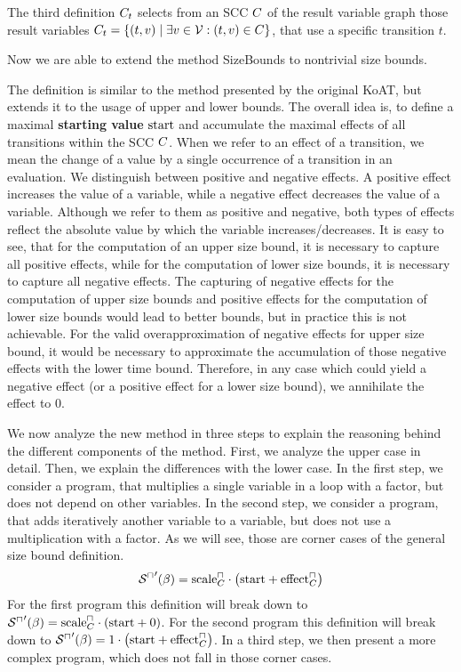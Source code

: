 The third definition $C_t$ selects from an SCC $C$ of the result variable graph those result variables $C_t = \lbrace (t,v) \mid \exists v \in \mathcal{V} : (t,v) \in C \rbrace$, that use a specific transition $t$.


Now we are able to extend the method SizeBounds to nontrivial size bounds.



The definition is similar to the method presented by the original KoAT, but extends it to the usage of upper and lower bounds.
The overall idea is, to define a maximal \textbf{starting value} $\text{start}$ and accumulate the maximal effects of all transitions within the SCC $C$.
When we refer to an effect of a transition, we mean the change of a value by a single occurrence of a transition in an evaluation.
We distinguish between positive and negative effects.
A positive effect increases the value of a variable, while a negative effect decreases the value of a variable.
Although we refer to them as positive and negative, both types of effects reflect the absolute value by which the variable increases/decreases.
It is easy to see, that for the computation of an upper size bound, it is necessary to capture all positive effects, while for the computation of lower size bounds, it is necessary to capture all negative effects.
The capturing of negative effects for the computation of upper size bounds and positive effects for the computation of lower size bounds would lead to better bounds, but in practice this is not achievable.
For the valid overapproximation of negative effects for upper size bound, it would be necessary to approximate the accumulation of those negative effects with the lower time bound.
Therefore, in any case which could yield a negative effect (or a positive effect for a lower size bound), we annihilate the effect to $0$.

We now analyze the new method in three steps to explain the reasoning behind the different components of the method.
First, we analyze the upper case in detail.
Then, we explain the differences with the lower case.
In the first step, we consider a program, that multiplies a single variable in a loop with a factor, but does not depend on other variables.
In the second step, we consider a program, that adds iteratively another variable to a variable, but does not use a multiplication with a factor.
As we will see, those are corner cases of the general size bound definition.
\[ {\mathcal{S}^\sqcap}'(\beta) = \text{scale}^\sqcap_C \cdot \left( \text{start} + \text{effect}^\sqcap_C \right) \]
For the first program this definition will break down to ${\mathcal{S}^\sqcap}'(\beta) = \text{scale}^\sqcap_C \cdot \left( \text{start} + 0 \right)$.
For the second program this definition will break down to ${\mathcal{S}^\sqcap}'(\beta) = 1 \cdot \left( \text{start} + \text{effect}^\sqcap_C \right)$.
In a third step, we then present a more complex program, which does not fall in those corner cases.

